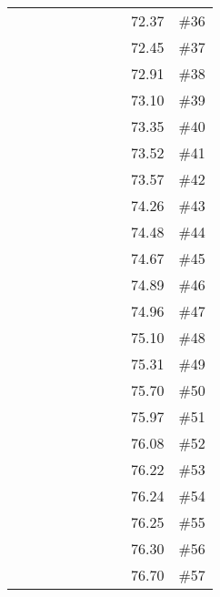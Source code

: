\begin{longtable}{|c|c|c|c|c|c|c|c|c|c|}
 \x    & \x    & \x    & \x    & \x    & \x    &       & \x\m  & 72.37 & \#36 \\
 \x    & \x    & \x    &       & \x    & \x    &       & \x    & 72.45 & \#37 \\
 \x    & \x    & \x    & \x    & \x    & \x\m  &       & \x\m  & 72.91 & \#38 \\
 \x    & \x    &       &       & \x\m  & \x\m  & \x\m  &       & 73.10 & \#39 \\
 \x    & \x    & \x    & \x    & \x\m  &       &       &       & 73.35 & \#40 \\
 \x    & \x    & \x    &       & \x    &       &       & \x    & 73.52 & \#41 \\
 \x    & \x    & \x    &       & \x    & \x\m  &       & \x\m  & 73.57 & \#42 \\
 \x    & \x    & \x    &       &       & \x    &       & \x\m  & 74.26 & \#43 \\
 \x    & \x    &       &       & \x\m  & \x\m  &       &       & 74.48 & \#44 \\
 \x    & \x    & \x    &       & \x    &       &       & \x\m  & 74.67 & \#45 \\
 \x    & \x    & \x    & \x    & \x\m  & \x    &       &       & 74.89 & \#46 \\
 \x    & \x    & \x    &       & \x    &       & \x    &       & 74.96 & \#47 \\
 \x    & \x    & \x    & \x    & \x    & \x    & \x    &       & 75.10 & \#48 \\
 \x    & \x    &       & \x    & \x    &       &       & \x    & 75.31 & \#49 \\
 \x    & \x    & \x    & \x    & \x    & \x    & \x\m  &       & 75.70 & \#50 \\
 \x    & \x    & \x    & \x    & \x    &       &       & \x\m  & 75.97 & \#51 \\
 \x    & \x    &       & \x    & \x\m  &       & \x\m  &       & 76.08 & \#52 \\
 \x    & \x    &       & \x    & \x\m  & \x\m  & \x\m  &       & 76.22 & \#53 \\
 \x    & \x    & \x    &       & \x    & \x\m  & \x    &       & 76.24 & \#54 \\
 \x    & \x    & \x    &       & \x\m  &       &       & \x\m  & 76.25 & \#55 \\
 \x    & \x    &       &       & \x\m  &       &       & \x\m  & 76.30 & \#56 \\
 \x    & \x    &       &       & \x\m  & \x\m  &       & \x\m  & 76.70 & \#57 \\

\end{longtable}
